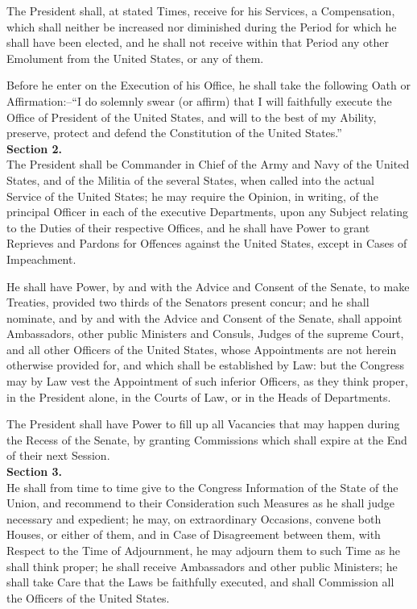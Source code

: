 The President shall, at stated Times, receive for his Services, a Compensation, which shall neither be increased nor diminished during the Period for which he shall have been elected, and he shall not receive within that Period any other Emolument from the United States, or any of them.

Before he enter on the Execution of his Office, he shall take the following Oath or Affirmation:--``I do solemnly swear (or affirm) that I will faithfully execute the Office of President of the United States, and will to the best of my Ability, preserve, protect and defend the Constitution of the United States.''\\[0.01in]

{\large \textbf{Section 2.}}\\[0.01in]

The President shall be Commander in Chief of the Army and Navy of the United States, and of the Militia of the several States, when called into the actual Service of the United States; he may require the Opinion, in writing, of the principal Officer in each of the executive Departments, upon any Subject relating to the Duties of their respective Offices, and he shall have Power to grant Reprieves and Pardons for Offences against the United States, except in Cases of Impeachment.

He shall have Power, by and with the Advice and Consent of the Senate, to make Treaties, provided two thirds of the Senators present concur; and he shall nominate, and by and with the Advice and Consent of the Senate, shall appoint Ambassadors, other public Ministers and Consuls, Judges of the supreme Court, and all other Officers of the United States, whose Appointments are not herein otherwise provided for, and which shall be established by Law: but the Congress may by Law vest the Appointment of such inferior Officers, as they think proper, in the President alone, in the Courts of Law, or in the Heads of Departments.

The President shall have Power to fill up all Vacancies that may happen during the Recess of the Senate, by granting Commissions which shall expire at the End of their next Session.\\[0.01in]

{\large \textbf{Section 3.}}\\[0.01in]

He shall from time to time give to the Congress Information of the State of the Union, and recommend to their Consideration such Measures as he shall judge necessary and expedient; he may, on extraordinary Occasions, convene both Houses, or either of them, and in Case of Disagreement between them, with Respect to the Time of Adjournment, he may adjourn them to such Time as he shall think proper; he shall receive Ambassadors and other public Ministers; he shall take Care that the Laws be faithfully executed, and shall Commission all the Officers of the United States.\\[0.01in]

